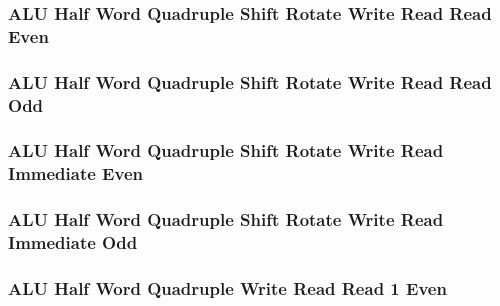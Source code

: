 

\subsubsection[{\small ALU Half Word Quadruple Shift Rotate Write Read Read Even}]{ALU Half Word Quadruple Shift Rotate Write Read Read Even} \label{sec:format-ALU-HQSWRRE}



\subsubsection[{\small ALU Half Word Quadruple Shift Rotate Write Read Read Odd}]{ALU Half Word Quadruple Shift Rotate Write Read Read Odd} \label{sec:format-ALU-HQSWRRO}



\subsubsection[{\small ALU Half Word Quadruple Shift Rotate Write Read Immediate Even}]{ALU Half Word Quadruple Shift Rotate Write Read Immediate Even} \label{sec:format-ALU-HQSWRIE}



\subsubsection[{\small ALU Half Word Quadruple Shift Rotate Write Read Immediate Odd}]{ALU Half Word Quadruple Shift Rotate Write Read Immediate Odd} \label{sec:format-ALU-HQSWRIO}



\subsubsection[{\small ALU Half Word Quadruple Write Read Read 1 Even}]{ALU Half Word Quadruple Write Read Read 1 Even} \label{sec:format-ALU-HQWRR1E}

